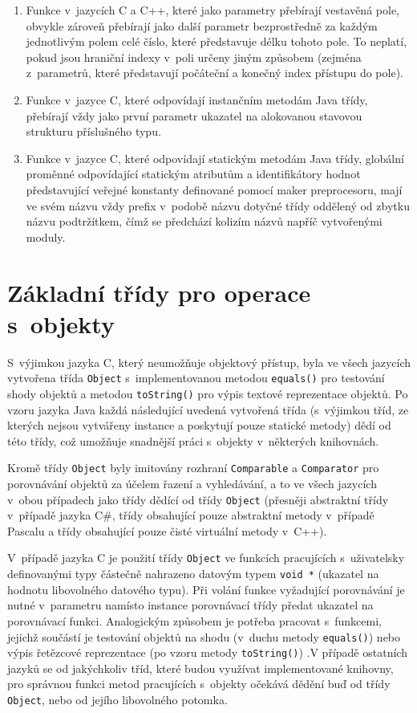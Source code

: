 \documentclass[czech,BP]{thesiskiv}
\begin{document}
\begin{enumerate}
\item{Funkce v~jazycích C a C++, které jako parametry přebírají vestavěná pole, obvykle zároveň přebírají jako další parametr bezprostředně za každým jednotlivým polem celé číslo, které představuje délku tohoto pole. To neplatí, pokud jsou hraniční indexy v~poli určeny jiným způsobem (zejména z~parametrů, které představují počáteční a konečný index přístupu do pole).}
\item{Funkce v~jazyce C, které odpovídají instančním metodám Java třídy, přebírají vždy jako první parametr ukazatel na alokovanou stavovou strukturu příslušného typu.}
\item{Funkce v~jazyce C, které odpovídají statickým metodám Java třídy, globální proměnné odpovídající statickým atributům a identifikátory hodnot představující veřejné konstanty definované pomocí maker preprocesoru, mají ve svém názvu vždy prefix v~podobě názvu dotyčné třídy oddělený od zbytku názvu podtržítkem, čímž se předchází kolizím názvů napříč vytvořenými moduly.}
\end{enumerate}

\section{Základní třídy pro operace s~objekty}
S~výjimkou jazyka C, který neumožňuje objektový přístup, byla ve všech jazycích vytvořena třída \texttt{Object} s~implementovanou metodou \texttt{equals()} pro testování shody objektů a metodou \texttt{toString()} pro výpis textové reprezentace objektů. Po vzoru jazyka Java každá následující uvedená vytvořená třída (s~výjimkou tříd, ze kterých nejsou vytvářeny instance a poskytují pouze statické metody) dědí od této třídy, což umožňuje snadnější práci s~objekty v~některých knihovnách.\par
Kromě třídy \texttt{Object} byly imitovány rozhraní \texttt{Comparable} a \texttt{Comparator} pro porovnávání objektů za účelem řazení a vyhledávání, a to ve všech jazycích v~obou případech jako třídy dědící od třídy \texttt{Object} (přesněji abstraktní třídy v~případě jazyka C\#, třídy obsahující pouze abstraktní metody v~případě Pascalu a třídy obsahující pouze čisté virtuální metody v~C++).\par
V~případě jazyka C je použití třídy \texttt{Object} ve funkcích pracujících s~uživatelsky definovanými typy částečně nahrazeno datovým typem \texttt{void *} (ukazatel na hodnotu libovolného datového typu). Při volání funkce vyžadující porovnávání je nutné v~parametru namísto instance porovnávací třídy předat ukazatel na porovnávací funkci. Analogickým způsobem je potřeba pracovat s~funkcemi, jejichž součástí je testování objektů na shodu (v~duchu metody \texttt{equals()}) nebo výpis řetězcové reprezentace (po vzoru metody \texttt{toString()}) .V případě ostatních jazyků se od jakýchkoliv tříd, které budou využívat implementované knihovny, pro správnou funkci metod pracujících s~objekty očekává dědění buď od třídy \texttt{Object}, nebo od jejího libovolného potomka.
\end{document}
